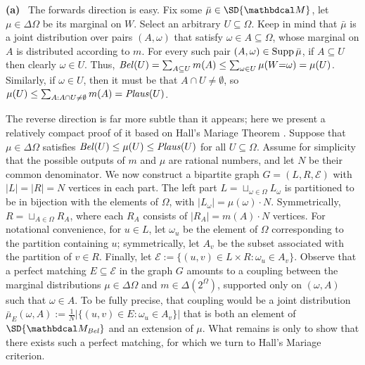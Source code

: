 \begin{lproof}
        \label{proof:belplaus-pdg}
    \textbf{(a)}~
    The forwards direction is easy. 
    Fix some $\bar\mu \in \SD{\dg M}$, let $\mu \in \Delta \Omega$ be its marginal on $W$. 
    Select an arbitrary $U \subseteq \Omega$. 
    Keep in mind that $\bar\mu$ is a joint distribution over pairs $(A, \omega)$ that satisfy $\omega \in A \subseteq \Omega$, whose marginal on $A$ is distributed according to $m$. 
    For every such pair $(A, \omega) \in \operatorname{\mathrm{Supp}} \bar\mu$, 
    if $A \subseteq U$ then clearly $\omega \in U$. 
    Thus, $\mathit{Bel}(U) = \sum_{A \subseteq U} m(A) \le \sum_{\omega \in U} \mu(W{=}\omega) = \mu(U)$.
    Similarly, if $\omega \in U$, then it must be that $A \cap U \ne \emptyset$, 
    so $\mu(U) \le  \sum_{A : A \cap U \ne \emptyset} m(A) = \mathit{Plaus}(U)$.

    The reverse direction is far more subtle than it appears;
        here we present a relatively compact proof of it based on Hall's
        Mariage Theorem \citep{Hall1935}. 
    Suppose that $\mu \in \Delta \Omega$ satisfies
        $\mathit{Bel}(U) \le \mu(U) \le \mathit{Plaus}(U)$ for all $U \subseteq \Omega$.
    Assume for simplicity that the possible outputs of $m$ and $\mu$ are rational numbers, and let $N$ be their common denominator. 
    We now construct a bipartite graph $G = (L, R, \mathcal E)$ with $|L| = |R| = N$ vertices in each part.
    The left part $L = \sqcup_{\omega \in \Omega} L_\omega$ 
    is partitioned to be in bijection with the elements of $\Omega$, with
        $|L_\omega| = \mu(\omega)\cdot N$. 
    Symmetrically, $R = \sqcup_{A \in \Omega} R_A$, where each $R_A$
        consists of $|R_A| = m(A) \cdot N$ vertices.
    For notational convenience, for $u \in L$, let $\omega_u$ be the element of $\Omega$ corresponding to the partition containing $u$; symmetrically,  let $A_v$ be the subset associated with the partition of $v \in R$. 
    Finally, let $\mathcal E := \{ (u,v) \in L \times R : \omega_u \in A_v\}.$
    Observe that a perfect matching $E \subseteq \mathcal E$ in the graph $G$ amounts to a coupling between the marginal distributions $\mu \in \Delta\Omega$ and $m \in \Delta(2^\Omega)$, supported only on $(\omega, A)$ such that $\omega \in A$.
    To be fully precise, that coupling would be a joint distribution $\bar\mu_E(\omega, A) := \frac1N |\{ (u,v) \in E : \omega_u \in A_v \}|$ that is both an element of $\SD{\dg M_\Bel}$ and an extension of $\mu$. 
    What remains is only to show that there exists such a perfect matching, for which we turn to Hall's Mariage criterion.     
    

\end{lproof}
